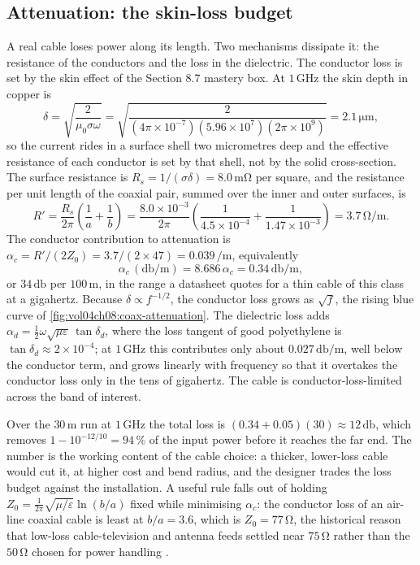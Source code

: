 \subsection{Attenuation: the skin-loss budget}

A real cable loses power along its length. Two mechanisms dissipate it:
the resistance of the conductors and the loss in the dielectric. The
conductor loss is set by the skin effect of the Section 8.7 mastery box.
At $1\,\si{\giga\hertz}$ the skin depth in copper is
\[
\delta = \sqrt{\frac{2}{\mu_0\sigma\omega}} = \sqrt{\frac{2}{(4\pi
\times 10^{-7})(5.96\times 10^{7})(2\pi\times 10^{9})}} = 2.1\,\si{
\micro\meter},
\]
so the current rides in a surface shell two micrometres deep and the
effective resistance of each conductor is set by that shell, not by the
solid cross-section. The surface resistance is $R_s = 1/(\sigma\delta) =
8.0\,\si{\milli\ohm}$ per square, and the resistance per unit length of
the coaxial pair, summed over the inner and outer surfaces, is
\[
R' = \frac{R_s}{2\pi}\left(\frac{1}{a} + \frac{1}{b}\right) =
\frac{8.0\times 10^{-3}}{2\pi}\left(\frac{1}{4.5\times 10^{-4}} +
\frac{1}{1.47\times 10^{-3}}\right) = 3.7\,\si{\ohm\per\meter}.
\]
The conductor contribution to attenuation is $\alpha_c = R'/(2Z_0) =
3.7/(2\times 47) = 0.039\,\si{\per\meter}$, equivalently
\[
\alpha_c\,(\si{\decibel\per\meter}) = 8.686\,\alpha_c = 0.34\,\si{
\decibel\per\meter},
\]
or $34\,\si{\decibel}$ per $100\,\si{\meter}$, in the range a datasheet
quotes for a thin cable of this class at a gigahertz. Because $\delta
\propto f^{-1/2}$, the conductor loss grows as $\sqrt{f}$, the rising
blue curve of \cref{fig:vol04ch08:coax-attenuation}. The dielectric
loss adds $\alpha_d = \tfrac12\omega\sqrt{\mu\varepsilon}\,\tan\delta_d$,
where the loss tangent of good polyethylene is $\tan\delta_d \approx
2\times 10^{-4}$; at $1\,\si{\giga\hertz}$ this contributes only about
$0.027\,\si{\decibel\per\meter}$, well below the conductor term, and
grows linearly with frequency so that it overtakes the conductor loss
only in the tens of gigahertz. The cable is conductor-loss-limited
across the band of interest.



Over the $30\,\si{\meter}$ run at $1\,\si{\giga\hertz}$ the total loss
is $(0.34 + 0.05)(30) \approx 12\,\si{\decibel}$, which removes
$1 - 10^{-12/10} = 94\,\%$ of the input power before it reaches the far
end. The number is the working content of the cable choice: a thicker,
lower-loss cable would cut it, at higher cost and bend radius, and the
designer trades the loss budget against the installation. A useful rule
falls out of holding $Z_0 = \tfrac{1}{2\pi}\sqrt{\mu/\varepsilon}\ln(b/a)$
fixed while minimising $\alpha_c$: the conductor loss of an air-line
coaxial cable is least at $b/a = 3.6$, which is $Z_0 = 77\,\si{\ohm}$,
the historical reason that low-loss cable-television and antenna feeds
settled near $75\,\si{\ohm}$ rather than the $50\,\si{\ohm}$ chosen for
power handling \cite[ch.~3]{text:pozar-microwave}.


